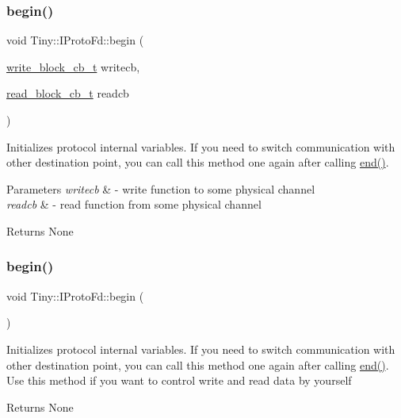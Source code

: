 \subsubsection{\texorpdfstring{begin()}{begin()}\hspace{0.1cm}{\footnotesize\ttfamily [1/2]}}
{\footnotesize\ttfamily void Tiny\+::\+I\+Proto\+Fd\+::begin (\begin{DoxyParamCaption}\item[{\hyperlink{tiny__types_8h_aafd634660bba76cace57a8f9b01e044d}{write\+\_\+block\+\_\+cb\+\_\+t}}]{writecb,  }\item[{\hyperlink{tiny__types_8h_a15bec127d9ee63658563d62e92b5261b}{read\+\_\+block\+\_\+cb\+\_\+t}}]{readcb }\end{DoxyParamCaption})}

Initializes protocol internal variables. If you need to switch communication with other destination point, you can call this method one again after calling \hyperlink{classTiny_1_1IProtoFd_ad17e76d0ef7ea40838e51acc2498c482}{end()}. 
\begin{DoxyParams}{Parameters}
{\em writecb} & -\/ write function to some physical channel \\
\hline
{\em readcb} & -\/ read function from some physical channel \\
\hline
\end{DoxyParams}
\begin{DoxyReturn}{Returns}
None 
\end{DoxyReturn}
\mbox{\label{classTiny_1_1IProtoFd_a33f836591bf981b484d495d678d02442}} 
\subsubsection{\texorpdfstring{begin()}{begin()}\hspace{0.1cm}{\footnotesize\ttfamily [2/2]}}
{\footnotesize\ttfamily void Tiny\+::\+I\+Proto\+Fd\+::begin (\begin{DoxyParamCaption}{ }\end{DoxyParamCaption})}

Initializes protocol internal variables. If you need to switch communication with other destination point, you can call this method one again after calling \hyperlink{classTiny_1_1IProtoFd_ad17e76d0ef7ea40838e51acc2498c482}{end()}. Use this method if you want to control write and read data by yourself \begin{DoxyReturn}{Returns}
None 
\end{DoxyReturn}
\mbox{\label{classTiny_1_1IProtoFd_a1cf42b4182e49dcde4862a768d07c811}} 
